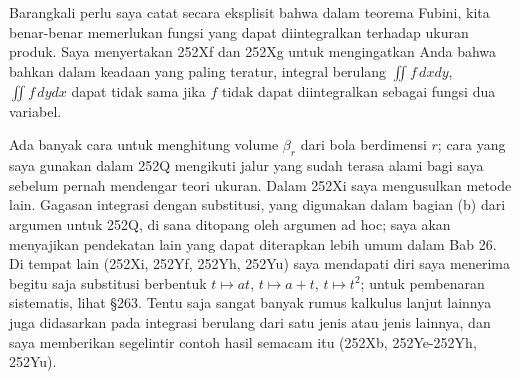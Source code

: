 {Barangkali perlu saya catat secara eksplisit bahwa dalam teorema Fubini, kita
benar-benar memerlukan fungsi yang dapat diintegralkan terhadap ukuran produk.
Saya menyertakan 252Xf dan 252Xg untuk mengingatkan Anda bahwa bahkan dalam
keadaan yang paling teratur, integral berulang $\iint f\,dxdy$,
$\iint f\,dydx$ dapat tidak sama jika $f$ tidak dapat diintegralkan sebagai
fungsi dua variabel.

Ada banyak cara untuk menghitung volume $\beta_r$ dari bola berdimensi $r$;
cara yang saya gunakan dalam 252Q mengikuti jalur yang sudah terasa alami bagi
saya sebelum pernah mendengar teori ukuran. Dalam 252Xi saya mengusulkan
metode lain. Gagasan integrasi dengan substitusi, yang digunakan dalam bagian
(b) dari argumen untuk 252Q, di sana ditopang oleh argumen ad hoc; saya akan
menyajikan pendekatan lain yang dapat diterapkan lebih umum dalam Bab 26. Di
tempat lain (252Xi, 252Yf, 252Yh, 252Yu) saya mendapati diri saya menerima
begitu saja substitusi berbentuk $t\mapsto at$, $t\mapsto a+t$,
$t\mapsto t^2$; untuk pembenaran sistematis, lihat \S263. Tentu saja sangat
banyak rumus kalkulus lanjut lainnya juga didasarkan pada integrasi berulang
dari satu jenis atau jenis lainnya, dan saya memberikan segelintir contoh
hasil semacam itu (252Xb,
252Ye-252Yh, %
252Yu).

}%

\discrpage

